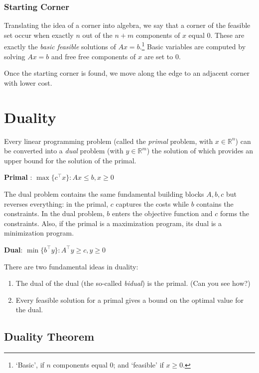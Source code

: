 \documentclass[11pt,]{article}
\providecommand{\tightlist}{%
  \setlength{\itemsep}{0pt}\setlength{\parskip}{0pt}}
\let\rmarkdownfootnote\footnote%
\def\footnote{\protect\rmarkdownfootnote}
\begin{document}
\subsubsection{Starting Corner}\label{starting-corner}

Translating the idea of a corner into algebra, we say that a corner of
the feasible set occur when exactly \(n\) out of the \(n+m\) components
of \(x\) equal 0. These are exactly the \emph{basic feasible} solutions
of \(Ax = b\).\footnote{`Basic', if \(n\) components equal 0; and
  `feasible' if \(x\geq 0\).} Basic variables are computed by solving
\(Ax = b\) and free free components of \(x\) are set to 0.

Once the starting corner is found, we move along the edge to an adjacent
corner with lower cost.

\section{Duality}\label{duality}

Every linear programming problem (called the \emph{primal} problem, with
\(x\in\mathbb{R}^n\)) can be converted into a \emph{dual} problem (with
\(y\in\mathbb{R}^m\)) the solution of which provides an upper bound for
the solution of the primal.

\textbf{Primal }: \(\max\{c^{\top} x\}: Ax\leq b, x\geq 0\)

The dual problem contains the same fundamental building blocks
\(A, b, c\) but reverses everything: in the primal, \(c\) captures the
costs while \(b\) contains the constraints. In the dual problem, \(b\)
enters the objective function and \(c\) forms the constraints. Also, if
the primal is a maximization program, its dual is a minimization
program.

\textbf{Dual}: \(\min\{b^{\top}y\}: A^{\top}y \geq c, y\geq 0\)

There are two fundamental ideas in duality:

\begin{enumerate}
\def\labelenumi{\arabic{enumi}.}
\tightlist
\item
  The dual of the dual (the so-called \emph{bidual}) is the primal. (Can
  you see how?)
\item
  Every feasible solution for a primal gives a bound on the optimal
  value for the dual.
\end{enumerate}

\subsection{Duality Theorem}\label{duality-theorem}
\end{document}
